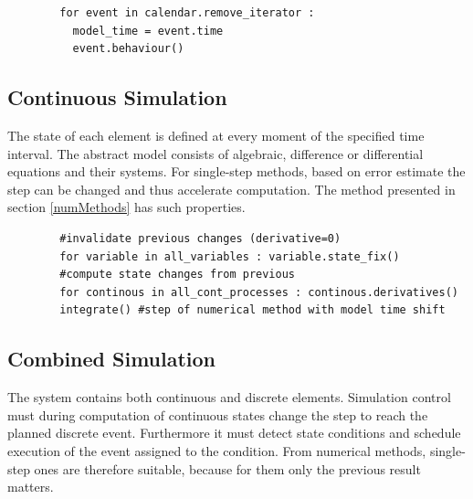 \documentclass[english]{cls/fitthesis}
\begin{document}
      \begin{verbatim}
      	for event in calendar.remove_iterator :
      	  model_time = event.time
      	  event.behaviour()
      \end{verbatim}


    \subsection{Continuous Simulation}
      The state of each element is defined at every moment of the specified time interval.
      The abstract model consists of algebraic, difference or differential equations and their systems.
      For single-step methods, based on error estimate the step can be changed and thus accelerate computation.
      The method presented in section \ref{numMethods} has such properties.

      \begin{verbatim}
        #invalidate previous changes (derivative=0)
        for variable in all_variables : variable.state_fix()
        #compute state changes from previous
        for continous in all_cont_processes : continous.derivatives()
        integrate() #step of numerical method with model time shift
      \end{verbatim}

    \subsection{Combined Simulation}\label{sim:comb}
      The system contains both continuous and discrete elements. Simulation control must during computation of continuous states
      change the step to reach the planned discrete event. Furthermore it must detect state conditions and
      schedule execution of the event assigned to the condition.
      From numerical methods, single-step ones are therefore suitable, because for them only the previous result matters.
\end{document}
